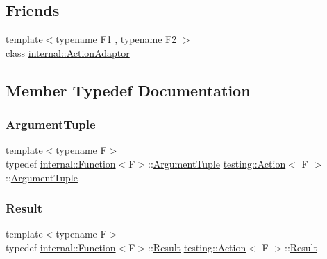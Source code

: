 \subsection*{Friends}
\begin{DoxyCompactItemize}
\item 
{\footnotesize template$<$typename F1 , typename F2 $>$ }\\class \hyperlink{classtesting_1_1_action_a66fe4f9c9b9d020273151aa6054b491e}{internal\+::\+Action\+Adaptor}
\end{DoxyCompactItemize}


\subsection{Member Typedef Documentation}
\mbox{\label{classtesting_1_1_action_ae27fda510696a9294f991de5b1abfaf2}} 
\subsubsection{\texorpdfstring{Argument\+Tuple}{ArgumentTuple}}
{\footnotesize\ttfamily template$<$typename F$>$ \\
typedef \hyperlink{structtesting_1_1internal_1_1_function}{internal\+::\+Function}$<$F$>$\+::\hyperlink{classtesting_1_1_action_ae27fda510696a9294f991de5b1abfaf2}{Argument\+Tuple} \hyperlink{classtesting_1_1_action}{testing\+::\+Action}$<$ F $>$\+::\hyperlink{classtesting_1_1_action_ae27fda510696a9294f991de5b1abfaf2}{Argument\+Tuple}}

\mbox{\label{classtesting_1_1_action_a9af08a21ad329331fde856cba9b6dea2}} 
\subsubsection{\texorpdfstring{Result}{Result}}
{\footnotesize\ttfamily template$<$typename F$>$ \\
typedef \hyperlink{structtesting_1_1internal_1_1_function}{internal\+::\+Function}$<$F$>$\+::\hyperlink{classtesting_1_1_action_a9af08a21ad329331fde856cba9b6dea2}{Result} \hyperlink{classtesting_1_1_action}{testing\+::\+Action}$<$ F $>$\+::\hyperlink{classtesting_1_1_action_a9af08a21ad329331fde856cba9b6dea2}{Result}}



